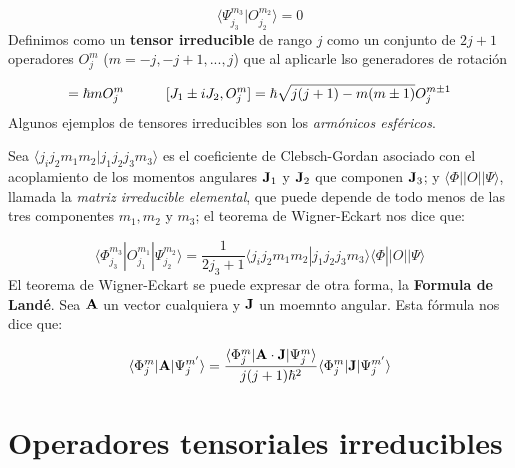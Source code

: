 \begin{equation}
    \langle \Psi_{j_3}^{m_3} | O_{j_2}^{m_2} \rangle = 0
\end{equation}
Definimos como un {\bf tensor irreducible} de rango $j$ como un conjunto de $2j+1$ operadores $O_{j}^m$  ($m=-j,-j+1,...,j$) que al aplicarle lso generadores de rotación

\begin{equation}
    [J_3,O_j^m] = \hbar m O_j^m \tquad [J_1\pm i J_2, O_j^m] = \hbar \sqrt{j(j+1)-m(m\pm 1)} O_{j}^{m\pm 1}
\end{equation}
Algunos ejemplos de tensores irreducibles son los {\it armónicos esféricos}. 

\begin{theorem}
    Sea $\langle j_i j_2 m_1 m_2 |j_1 j_2 j_3 m_3 \rangle$ es el coeficiente de Clebsch-Gordan asociado con el acoplamiento de los momentos angulares $\mathbf{J}_1$ y $\mathbf{J}_2$ que componen $\mathbf{J}_3$; y $\langle \Phi || O || \Psi\rangle$, llamada la {\it matriz irreducible elemental}, que puede depende de todo menos de las tres componentes $m_1,m_2$ y $m_3$; el teorema de Wigner-Eckart nos dice que:

    \begin{equation}
        \langle \Phi_{j_3}^{m_3} | O_{j_1}^{m_1} |\Psi_{j_2}^{m_2} \rangle = \frac{1}{2j_3+1} \langle  j_i j_2 m_1 m_2 | j_1 j_2 j_3 m_3 \rangle \langle \Phi || O || \Psi  \rangle
    \end{equation}
    El teorema de Wigner-Eckart se puede expresar de otra forma, la {\bf Formula de Landé}. Sea $\mathbf{A}$ un vector cualquiera y $\mathbf{J}$ un moemnto angular. Esta fórmula nos dice que:

    \begin{equation}
        \langle \Phi_{j}^{m} | \mathbf{A} |\Psi_{j}^{m'} \rangle = \frac{\langle \Phi_j^m |\mathbf{A} \cdot \mathbf{J} | \Psi_j^m\rangle }{j(j+1)\hbar^2} \langle \Phi_j^m | \mathbf{J}| \Psi_j^{m'}  \rangle
    \end{equation}
    
\end{theorem}

\section{Operadores tensoriales irreducibles}

 
